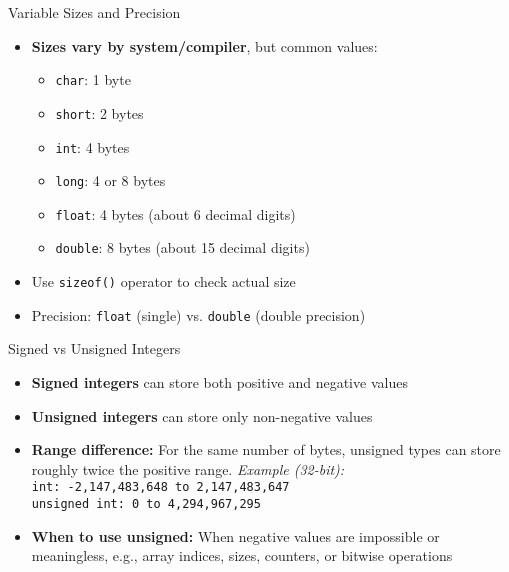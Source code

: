 \documentclass[12pt, aspectratio=169]{beamer}
\begin{document}
    \begin{frame}{Variable Sizes and Precision}
        \begin{itemize}
            \item \textbf{Sizes vary by system/compiler}, but common values:
                \begin{itemize}
                    \item \texttt{char}: 1 byte
                    \item \texttt{short}: 2 bytes
                    \item \texttt{int}: 4 bytes
                    \item \texttt{long}: 4 or 8 bytes
                    \item \texttt{float}: 4 bytes (about 6 decimal digits)
                    \item \texttt{double}: 8 bytes (about 15 decimal digits)
                \end{itemize}
            \item Use \texttt{sizeof()} operator to check actual size
            \item Precision: \texttt{float} (single) vs. \texttt{double} (double precision)
        \end{itemize}
    \end{frame}


    \begin{frame}{Signed vs Unsigned Integers}
        \begin{itemize}
            \item \textbf{Signed integers} can store both positive and negative values
            \item \textbf{Unsigned integers} can store only non-negative values
            \item \textbf{Range difference:} For the same number of bytes, unsigned types can store roughly twice the positive range. 
                \textit{Example (32-bit):}\\
                \texttt{int: -2,147,483,648 to 2,147,483,647}\\
                \texttt{unsigned int: 0 to 4,294,967,295}
            \item \textbf{When to use unsigned:} When negative values are impossible or meaningless, e.g., array indices, sizes, counters, or bitwise operations
        \end{itemize}
    \end{frame}
\end{document}

